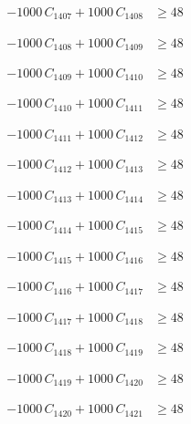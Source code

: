 \documentclass[a4paper,11pt]{article}
\begin{document}
\begin{align}
-1000\,C_{1407} + 1000\,C_{1408} &\geq 48 \nonumber
\end{align}

\begin{align}
-1000\,C_{1408} + 1000\,C_{1409} &\geq 48 \nonumber
\end{align}

\begin{align}
-1000\,C_{1409} + 1000\,C_{1410} &\geq 48 \nonumber
\end{align}

\begin{align}
-1000\,C_{1410} + 1000\,C_{1411} &\geq 48 \nonumber
\end{align}

\begin{align}
-1000\,C_{1411} + 1000\,C_{1412} &\geq 48 \nonumber
\end{align}

\begin{align}
-1000\,C_{1412} + 1000\,C_{1413} &\geq 48 \nonumber
\end{align}

\begin{align}
-1000\,C_{1413} + 1000\,C_{1414} &\geq 48 \nonumber
\end{align}

\begin{align}
-1000\,C_{1414} + 1000\,C_{1415} &\geq 48 \nonumber
\end{align}

\begin{align}
-1000\,C_{1415} + 1000\,C_{1416} &\geq 48 \nonumber
\end{align}

\begin{align}
-1000\,C_{1416} + 1000\,C_{1417} &\geq 48 \nonumber
\end{align}

\begin{align}
-1000\,C_{1417} + 1000\,C_{1418} &\geq 48 \nonumber
\end{align}

\begin{align}
-1000\,C_{1418} + 1000\,C_{1419} &\geq 48 \nonumber
\end{align}

\begin{align}
-1000\,C_{1419} + 1000\,C_{1420} &\geq 48 \nonumber
\end{align}

\begin{align}
-1000\,C_{1420} + 1000\,C_{1421} &\geq 48 \nonumber
\end{align}
\end{document}
